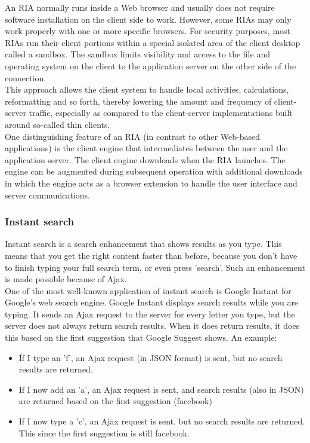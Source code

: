 An RIA normally runs inside a Web browser and usually does not require software installation on the client side to work. However, some RIAs may only work properly with one or more specific browsers. For security purposes, most RIAs run their client portions within a special isolated area of the client desktop called a sandbox. The sandbox limits visibility and access to the file and operating system on the client to the application server on the other side of the connection.\\
 
This approach allows the client system to handle local activities, calculations, reformatting and so forth, thereby lowering the amount and frequency of client-server traffic, especially as compared to the client-server implementations built around so-called thin clients.\\
 
One distinguishing feature of an RIA (in contrast to other Web-based applications) is the client engine that intermediates between the user and the application server. The client engine downloads when the RIA launches. The engine can be augmented during subsequent operation with additional downloads in which the engine acts as a browser extension to handle the user interface and server communications.
		
\subsubsection{Instant search}
Instant search is a search enhancement that shows results as you type. This means that you get the right content faster than before, because you don't have to finish typing your full search term, or even press 'search'. Such an enhancement is made possible because of Ajax.\\
	
One of the most well-known application of instant search is Google Instant for Google's web search engine. Google Instant displays search results while you are typing. It sends an Ajax request to the server for every letter you type, but the server does not always return search results. When it does return results, it does this based on the first suggestion that Google Suggest shows. An example:
\begin{itemize}
	\setlength\itemsep{0em}
	\item Íf I type an 'f', an Ajax request (in JSON format) is sent, but no search results are returned.
	\item If I now add an 'a', an Ajax request is sent, and search results (also in JSON) are returned based on the first suggestion (facebook)
	\item If I now type a 'c', an Ajax request is sent, but no search results are returned. This since the first suggestion is still facebook.
\end{itemize}
	
